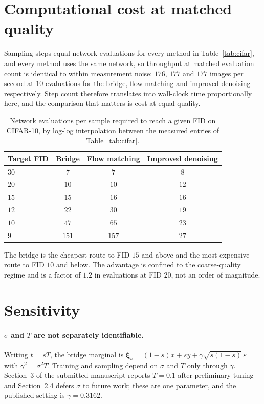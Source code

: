 \documentclass[11pt,a4paper]{article}
\def\xib{\boldsymbol{\xi}}
\begin{document}
\section{Computational cost at matched quality}
\label{sec:cost}

Sampling steps equal network evaluations for every method in
Table~\ref{tab:cifar}, and every method uses the same network, so throughput at
matched evaluation count is identical to within measurement noise: $176$, $177$
and $177$ images per second at $10$ evaluations for the bridge, flow matching and
improved denoising respectively. Step count therefore translates into wall-clock
time proportionally here, and the comparison that matters is cost at equal
quality.

\begin{table}[h]
\centering
\caption{Network evaluations per sample required to reach a given FID on
CIFAR-10, by log-log interpolation between the measured entries of
Table~\ref{tab:cifar}.}
\label{tab:cost}
\begin{tabular}{lccc}
\toprule
Target FID & Bridge & Flow matching & Improved denoising\\
\midrule
$30$ & $7$ & $7$ & $8$\\
$20$ & $10$ & $10$ & $12$\\
$15$ & $15$ & $16$ & $16$\\
$12$ & $22$ & $30$ & $19$\\
$10$ & $47$ & $65$ & $23$\\
$9$  & $151$ & $157$ & $27$\\
\bottomrule
\end{tabular}
\end{table}

The bridge is the cheapest route to FID $15$ and above and the most expensive
route to FID $10$ and below. The advantage is confined to the coarse-quality
regime and is a factor of $1.2$ in evaluations at FID $20$, not an order of
magnitude.

\section{Sensitivity}
\label{sec:sensitivity}

\paragraph{$\sigma$ and $T$ are not separately identifiable.} Writing $t=sT$,
the bridge marginal is $\xib_s=(1-s)x+sy+\gamma\sqrt{s(1-s)}\,\varepsilon$ with
$\gamma^2=\sigma^2T$. Training and sampling depend on $\sigma$ and $T$ only
through $\gamma$. Section~3 of the submitted manuscript reports $T=0.1$ after
preliminary tuning and Section~2.4 defers $\sigma$ to future work; these are one
parameter, and the published setting is $\gamma=0.3162$.
\end{document}
